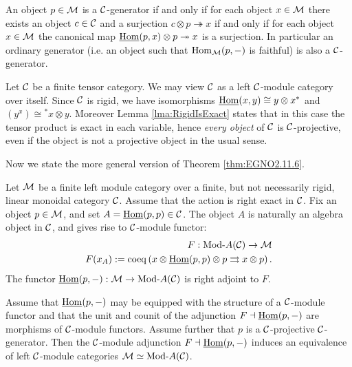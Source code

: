 \documentclass{amsart}
\begin{document}
\begin{remark}
	An object $p \in \mathcal M$ is a $\mathcal C$-generator if and only if for each object $x \in \mathcal M$ there exists an object $c \in \mathcal C$ and a surjection $c \otimes p \twoheadrightarrow x$ if and only if for each object $x \in \mathcal M$ the canonical map $\operatorname{\underline{Hom}}(p,x) \otimes p \twoheadrightarrow x$ is a surjection. In particular an ordinary generator (i.e. an object such that $\operatorname{Hom}_\mathcal M(p,-)$ is faithful) is also a $\mathcal C$-generator. 
\end{remark}

\begin{example} \label{ex:rigid_all_C-proj}
	Let $\mathcal C$ be a finite tensor category. We may view $\mathcal C$ as a left $\mathcal C$-module category over itself. Since $\mathcal C$ is rigid, we have isomorphisms $\operatorname{\underline{Hom}}(x,y) \cong y \otimes x^*$ and $(y^x) \cong {}^*x \otimes y$. Moreover Lemma \ref{lma:RigidIsExact} states that in this case the tensor product is exact in each variable, hence {\em every object} of $\mathcal C$ is $\mathcal C$-projective, even if the object is not a projective object in the usual sense. %
\end{example}

Now we state the more general version of Theorem \ref{thm:EGNO2.11.6}.

\begin{theorem} \label{thm:C-module-Embedding} %
	Let $\mathcal M$ be a finite left module category over a finite, but not necessarily rigid, linear monoidal category $\mathcal C$. Assume that the action is right exact in $\mathcal C$. 
	Fix an object $p \in \mathcal M$, and set $A = \operatorname{\underline{Hom}}(p,p) \in \mathcal C$. The object $A$ is naturally an algebra object in $\mathcal C$, and gives rise to $\mathcal C$-module functor:
	\begin{align*}
		F:   \Mod{}{A}(\cC) \to \cM \\
		F(x_A) := \coeq \left( x \otimes \IHom(p,p) \otimes p \rightrightarrows x \otimes p \right).
	\end{align*}
The functor $\IHom(p,-): \cM \to \Mod{}{A}(\cC)$ is right adjoint to $F$. 

Assume that $\operatorname{\underline{Hom}}(p,-)$ may be equipped with the structure of a $\mathcal C$-module functor and that the unit and counit of the adjunction $F \dashv \operatorname{\underline{Hom}}(p,-)$ are morphisms of $\mathcal C$-module functors. Assume further that $p$ is a $\mathcal C$-projective $\mathcal C$-generator.  Then the $\mathcal C$-module adjunction  $F \dashv \operatorname{\underline{Hom}}(p,-)$
	induces an equivalence of left $\mathcal C$-module categories $\cM \simeq \Mod{}{A}(\cC)$. 
\end{theorem}
\end{document}
